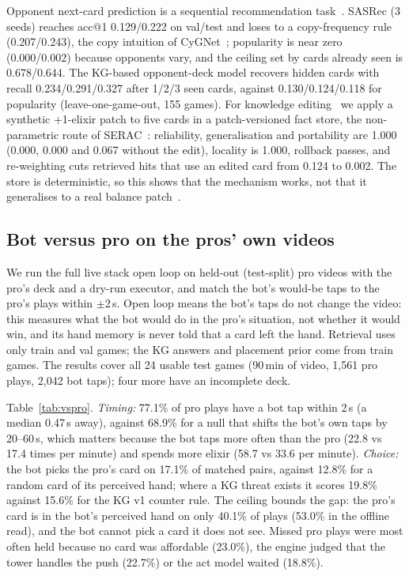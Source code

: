 \documentclass[conference]{IEEEtran}
\begin{document}
Opponent next-card prediction is a sequential recommendation task~\cite{kang2018sasrec,lim2026l14}. SASRec (3 seeds) reaches acc@1 0.129/0.222 on val/test and loses to a copy-frequency rule (0.207/0.243), the copy intuition of CyGNet~\cite{zhu2021cygnet,cap6938L06C}; popularity is near zero (0.000/0.002) because opponents vary, and the ceiling set by cards already seen is 0.678/0.644. The KG-based opponent-deck model recovers hidden cards with recall 0.234/0.291/0.327 after 1/2/3 seen cards, against 0.130/0.124/0.118 for popularity (leave-one-game-out, 155 games). %
For knowledge editing~\cite{yao2023editingsurvey,lim2026l17} we apply a synthetic +1-elixir patch to five cards in a patch-versioned fact store, the non-parametric route of SERAC~\cite{mitchell2022serac}: reliability, generalisation and portability are 1.000 (0.000, 0.000 and 0.067 without the edit), locality is 1.000, rollback passes, and re-weighting cuts retrieved hits that use an edited card from 0.124 to 0.002. The store is deterministic, so this shows that the mechanism works, not that it generalises to a real balance patch~\cite{yang2025mirage}. %

\subsection{Bot versus pro on the pros' own videos}

We run the full live stack open loop on held-out (test-split) pro videos with the pro's deck and a dry-run executor, and match the bot's would-be taps to the pro's plays within $\pm$2\,s. Open loop means the bot's taps do not change the video: this measures what the bot would do in the pro's situation, not whether it would win, and its hand memory is never told that a card left the hand. Retrieval uses only train and val games; the KG answers and placement prior come from train games. The results cover all 24 usable test games (90\,min of video, 1,561 pro plays, 2,042 bot taps); four more have an incomplete deck. %

Table~\ref{tab:vspro}. \emph{Timing:} 77.1\% of pro plays have a bot tap within 2\,s (a median 0.47\,s away), against 68.9\% for a null that shifts the bot's own taps by 20--60\,s, which matters because the bot taps more often than the pro (22.8 vs 17.4 times per minute) and spends more elixir (58.7 vs 33.6 per minute). \emph{Choice:} the bot picks the pro's card on 17.1\% of matched pairs, against 12.8\% for a random card of its perceived hand; where a KG threat exists it scores 19.8\% against 15.6\% for the KG v1 counter rule. The ceiling bounds the gap: the pro's card is in the bot's perceived hand on only 40.1\% of plays (53.0\% in the offline read), and the bot cannot pick a card it does not see. Missed pro plays were most often held because no card was affordable (23.0\%), the engine judged that the tower handles the push (22.7\%) or the act model waited (18.8\%). %
\end{document}
